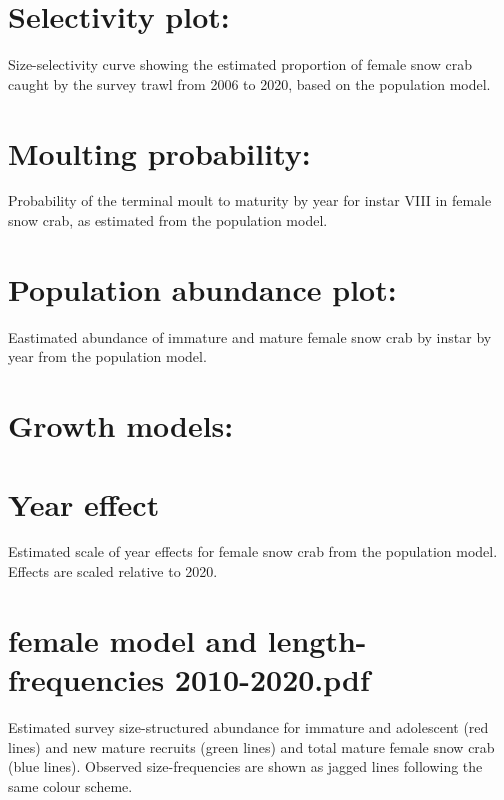 \documentclass[
]{article}
\begin{document}
\hypertarget{selectivity-plot}{%
\section{Selectivity plot:}\label{selectivity-plot}}

Size-selectivity curve showing the estimated proportion of female snow
crab caught by the survey trawl from 2006 to 2020, based on the
population model.

\hypertarget{moulting-probability}{%
\section{Moulting probability:}\label{moulting-probability}}

Probability of the terminal moult to maturity by year for instar VIII in
female snow crab, as estimated from the population model.

\hypertarget{population-abundance-plot}{%
\section{Population abundance plot:}\label{population-abundance-plot}}

Eastimated abundance of immature and mature female snow crab by instar
by year from the population model.

\hypertarget{growth-models}{%
\section{Growth models:}\label{growth-models}}

\hypertarget{year-effect}{%
\section{Year effect}\label{year-effect}}

Estimated scale of year effects for female snow crab from the population
model. Effects are scaled relative to 2020.

\hypertarget{female-model-and-length-frequencies-2010-2020.pdf}{%
\section{female model and length-frequencies
2010-2020.pdf}\label{female-model-and-length-frequencies-2010-2020.pdf}}

Estimated survey size-structured abundance for immature and adolescent
(red lines) and new mature recruits (green lines) and total mature
female snow crab (blue lines). Observed size-frequencies are shown as
jagged lines following the same colour scheme.
\end{document}
